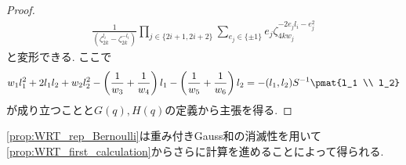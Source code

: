 \documentclass[11pt,b5paper,oneside,lualatex]{ltjsarticle} %
\numberwithin{equation}{section} %
\begin{document}
\begin{proof}
\begin{align}
		\frac{1}{\left( \zeta_{2k}^{l_i} - \zeta_{2k}^{-l_i} \right)}
		\prod_{j \in \{ 2i+1, 2i+2 \}} \sum_{e_j \in \{ \pm 1 \} } e_j
		\zeta_{4k w_j}^{ -2 e_j l_i - e_j^2 } 
	\end{align}
	と変形できる. 
	ここで
	\[
	w_1 l_1^2 + 2 l_1 l_2 + w_2 l_2^2
	- \left( \frac{1}{w_3} + \frac{1}{w_4} \right) l_1
	- \left( \frac{1}{w_5} + \frac{1}{w_6} \right) l_2
	=
	-(l_1, l_2) S^{-1} \pmat{l_1 \\ l_2}
	\]
	が成り立つことと$ G(q), H(q) $の定義から主張を得る. 
\end{proof}

\cref{prop:WRT_rep_Bernoulli}は重み付きGauss和の消滅性を用いて\cref{prop:WRT_first_calculation}からさらに計算を進めることによって得られる. 
\end{document}

